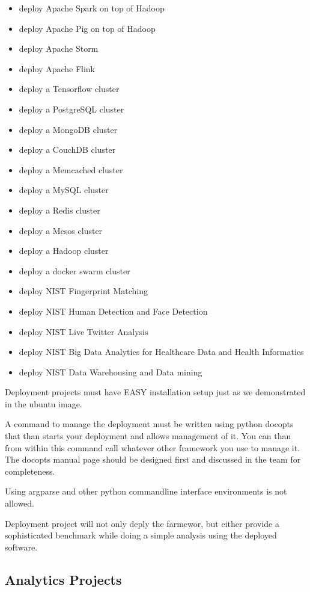 \begin{itemize}

\item
  deploy Apache Spark on top of Hadoop
\item
  deploy Apache Pig on top of Hadoop
\item
  deploy Apache Storm
\item
  deploy Apache Flink
\item
  deploy a Tensorflow cluster
\item
  deploy a PostgreSQL cluster
\item
  deploy a MongoDB cluster
\item
  deploy a CouchDB cluster
\item
  deploy a Memcached cluster
\item
  deploy a MySQL cluster
\item
  deploy a Redis cluster
\item
  deploy a Mesos cluster
\item
  deploy a Hadoop cluster
\item
  deploy a docker swarm cluster
\item
  deploy NIST Fingerprint Matching
\item
  deploy NIST Human Detection and Face Detection
\item
  deploy NIST Live Twitter Analysis
\item
  deploy NIST Big Data Analytics for Healthcare Data and Health
  Informatics
\item
  deploy NIST Data Warehousing and Data mining
\end{itemize}

Deployment projects must have EASY installation setup just as we
demonstrated in the ubuntu image.

A command to manage the deployment must be written using python docopts
that than starts your deployment and allows management of it. You can
than from within this command call whatever other framework you use to
manage it. The docopts manual page should be designed first and
discussed in the team for completeness.

Using argparse and other python commandline interface environments is
not allowed.

Deployment project will not only deply the farmewor, but either provide
a sophisticated benchmark while doing a simple analysis using the
deployed software.

\subsection{Analytics Projects}\label{analytics-projects}

